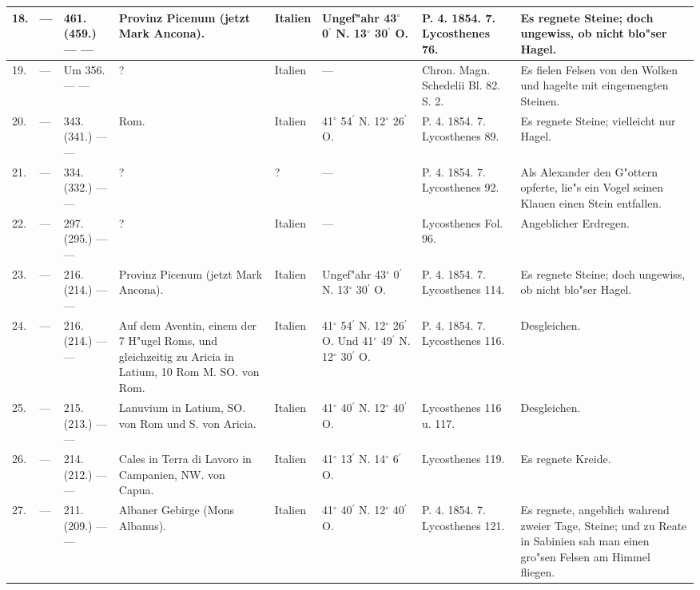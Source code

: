\documentclass[a4paper, 8pt, oneside, polutonikogreek, german]{article}
\begin{document}
\begin{center}
\begin{longtable}{| p{5mm} | p{3mm} | p{15mm} | p{25mm} | p{20mm} | p{14mm} | p{17mm} | p{24mm} |}
        18. & --- & 461. (459.) --- --- & Provinz Picenum (jetzt Mark Ancona). & Italien & Ungef"ahr 43$^\circ$ 0$^\prime$ N. 13$^\circ$ 30$^\prime$ O. & P. 4. 1854. 7. Lycosthenes 76. & Es regnete Steine; doch ungewiss, ob nicht blo"ser Hagel. \\ \hline
        19. & --- & Um 356. --- --- & ? & Italien & --- & Chron. Magn. Schedelii Bl. 82. S. 2. & Es fielen Felsen von den Wolken und hagelte mit eingemengten Steinen. \\ \hline
        20. & --- & 343. (341.) --- --- & Rom. & Italien & 41$^\circ$ 54$^\prime$ N. 12$^\circ$ 26$^\prime$ O. & P. 4. 1854. 7. Lycosthenes 89. & Es regnete Steine; vielleicht nur Hagel. \\ \hline
        21. & --- & 334. (332.) --- --- & ? & ? & --- & P. 4. 1854. 7. Lycosthenes 92. & Als Alexander den G"ottern opferte, lie"s ein Vogel seinen Klauen einen Stein entfallen. \\ \hline
        22. & --- & 297. (295.) --- --- & ? & Italien & --- & Lycosthenes Fol. 96. & Angeblicher Erdregen. \\ \hline
        23. & --- & 216. (214.) --- --- & Provinz Picenum (jetzt Mark Ancona). & Italien & Ungef"ahr 43$^\circ$ 0$^\prime$ N. 13$^\circ$ 30$^\prime$ O. & P. 4. 1854. 7. Lycosthenes 114. & Es regnete Steine; doch ungewiss, ob nicht blo"ser Hagel. \\ \hline
        24. & --- & 216. (214.) --- --- & Auf dem Aventin, einem der 7 H"ugel Roms, und gleichzeitig zu Aricia in Latium, 10 Rom M. SO. von Rom. & Italien & 41$^\circ$ 54$^\prime$ N. 12$^\circ$ 26$^\prime$ O. Und 41$^\circ$ 49$^\prime$ N. 12$^\circ$ 30$^\prime$ O. & P. 4. 1854. 7. Lycosthenes 116. & Desgleichen. \\ \hline
        25. & --- & 215. (213.) --- --- & Lanuvium in Latium, SO. von Rom und S. von Aricia. & Italien & 41$^\circ$ 40$^\prime$ N. 12$^\circ$ 40$^\prime$ O. & Lycosthenes 116 u. 117. & Desgleichen. \\ \hline
        26. & --- & 214. (212.) --- --- & Cales in Terra di Lavoro in Campanien, NW. von Capua. & Italien & 41$^\circ$ 13$^\prime$ N. 14$^\circ$ 6$^\prime$ O. & Lycosthenes 119. & Es regnete Kreide. \\ \hline
        27. & --- & 211. (209.) --- --- & Albaner Gebirge (Mons Albanus). & Italien & 41$^\circ$ 40$^\prime$ N. 12$^\circ$ 40$^\prime$ O. & P. 4. 1854. 7. Lycosthenes 121. & Es regnete, angeblich wahrend zweier Tage, Steine; und zu Reate in Sabinien sah man einen gro"sen Felsen am Himmel fliegen. \\ \hline

\end{longtable}
\end{center}
\end{document}
